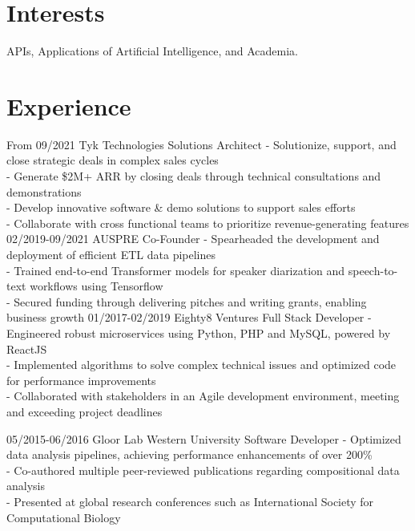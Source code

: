 \documentclass[]{twentysecondcv}
\begin{document}

\section{Interests}
APIs, Applications of Artificial Intelligence, and Academia.

\section{Experience}

\begin{twenty}
  \twentyitem
    {From 09/2021}
    {Tyk Technologies}
    {Solutions Architect}
    {- Solutionize, support, and close strategic deals in complex sales cycles \\
    - Generate \$2M+ ARR by closing deals through technical consultations and demonstrations \\
    - Develop innovative software \& demo solutions to support sales efforts \\
    - Collaborate with cross functional teams to prioritize revenue-generating features }
  \twentyitem
    {02/2019-09/2021}
    {AUSPRE}
    {Co-Founder}
    {- Spearheaded the development and deployment of efficient ETL data pipelines \\ 
    - Trained end-to-end Transformer models for speaker diarization and speech-to-text workflows using Tensorflow \\
    - Secured funding through delivering pitches and writing grants, enabling business growth}
\twentyitem
    {01/2017-02/2019}
    {Eighty8 Ventures}
    {Full Stack Developer}
    {- Engineered robust microservices using Python, PHP and MySQL, powered by ReactJS \\ 
    - Implemented algorithms to solve complex technical issues and optimized code for performance improvements \\
    - Collaborated with stakeholders in an Agile development environment, meeting and exceeding project deadlines}

\twentyitem
    {05/2015-06/2016}
    {Gloor Lab Western University}
    {Software Developer}
    {- Optimized data analysis pipelines, achieving performance enhancements of over 200\% \\ 
    - Co-authored multiple peer-reviewed publications regarding compositional data analysis  \\
    - Presented at global research conferences such as International Society for Computational Biology
}

\end{twenty}
\end{document}
